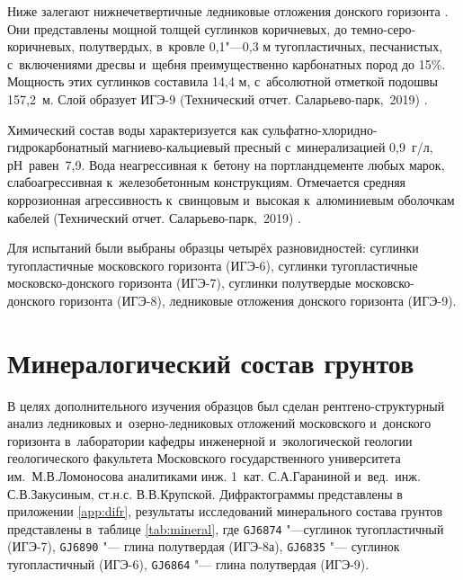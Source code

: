 Ниже залегают нижнечетвертичные ледниковые отложения донского горизонта . 
Они представлены мощной толщей суглинков коричневых, до темно-серо-коричневых, полутвердых, в~кровле 0,1"---0,3 м тугопластичных, песчанистых, с~включениями дресвы и~щебня преимущественно карбонатных пород до 15\%. 
Мощность этих суглинков составила 14,4 м, с~абсолютной отметкой подошвы 157,2~м. 
Слой образует ИГЭ-9 (Технический отчет. Саларьево-парк,~2019) \cite{moshkin2019}.

Химический состав воды характеризуется как сульфатно-хлоридно-гидрокарбонатный магниево-кальциевый пресный с~минерализацией 0,9~г/л, рН~равен~7,9. 
Вода неагрессивная к~бетону на портландцементе любых марок, слабоагрессивная к~железобетонным конструкциям. 
Отмечается средняя коррозионная агрессивность к~свинцовым и~высокая к~алюминиевым оболочкам кабелей (Технический отчет. Саларьево-парк,~2019) \cite{moshkin2019}.


Для испытаний были выбраны образцы четырёх разновидностей: 
суглинки тугопластичные московского горизонта (ИГЭ-6), 
суглинки тугопластичные московско-донского горизонта (ИГЭ-7), 
суглинки полутвердые московско-донского горизонта (ИГЭ-8), 
ледниковые отложения донского горизонта (ИГЭ-9). 




 \section{Минералогический состав грунтов} 

В целях дополнительного изучения образцов был сделан рентгено-структурный анализ 
ледниковых и~озерно-ледниковых отложений московского и~донского горизонта 
в~лаборатории кафедры инженерной и~экологической геологии 
геологического факультета Московского государственного университета им.~М.\:В.\:Ломоносова 
аналитиками инж. 1~кат. С.\:А.\:Гараниной и~вед.~инж. С.\:В.\:Закусиным, ст.\:н.\:с. В.\:В.\:Крупской.
Дифрактограммы представлены в приложении \ref{app:difr}, результаты исследований минерального состава грунтов представлены в~таблице \ref{tab:mineral}, 
где \texttt{GJ6874} "---суглинок тугопластичный (ИГЭ-7), 
\texttt{GJ6890} "--- глина полутвердая (ИГЭ-8а), 
\texttt{GJ6835} "--- суглинок тугопластичный (ИГЭ-6), 
\texttt{GJ6864} "--- глина полутвердая (ИГЭ-9).


